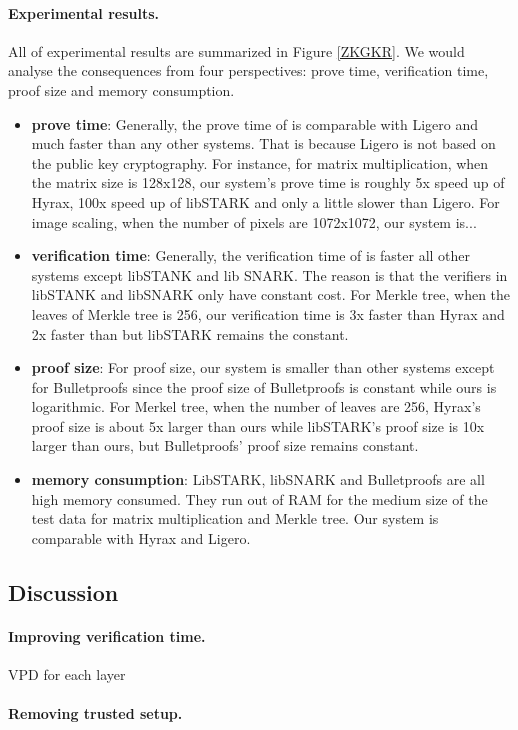 \paragraph{Experimental results.} All of experimental results are summarized in Figure \ref{ZKGKR}. We would analyse the consequences from four perspectives: prove time, verification time, proof size and memory consumption.
\begin{itemize}
	\item \textbf{prove time}: Generally, the prove time of \name{} is comparable with Ligero and much faster than any other systems. That is because Ligero is not based on the public key cryptography. For instance, for matrix multiplication, when the matrix size is 128x128, our system's prove time is roughly 5x speed up of Hyrax, 100x speed up of libSTARK and only a little slower than Ligero. For image scaling, when the number of pixels are 1072x1072, our system is...
	\item \textbf{verification time}: Generally, the verification time of \name{} is faster all other systems except libSTANK and lib SNARK. The reason is that the verifiers in libSTANK and libSNARK only have constant cost. For Merkle tree, when the leaves of Merkle tree is 256, our verification time is 3x faster than Hyrax and 2x faster than but libSTARK remains the constant. 
	\item \textbf{proof size}: For proof size, our system is smaller than other systems except for Bulletproofs since the proof size of Bulletproofs is constant while ours is logarithmic. For Merkel tree, when the number of leaves are 256, Hyrax's proof size is about 5x larger than ours while libSTARK's proof size is 10x larger than ours, but Bulletproofs' proof size remains constant.  
	\item \textbf{memory consumption}: LibSTARK, libSNARK and Bulletproofs are all high memory consumed. They run out of RAM for the medium size of the test data for matrix multiplication and Merkle tree. Our system is comparable with Hyrax and Ligero.
\end{itemize}

\subsection{Discussion}

\paragraph{Improving verification time.}

VPD for each layer

\paragraph{Removing trusted setup.}
